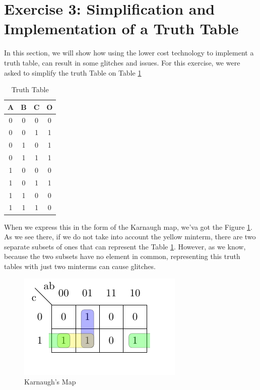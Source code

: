 \section{\color{olive}Exercise 3: Simplification and Implementation of a Truth Table }

In this section, we will show how using the lower cost technology
to implement a truth table, can result in some glitches and issues.
For this exercise, we were asked to simplify the truth Table on Table
\ref{3_1}

\begin{table}[h!]
\begin{centering}
\begin{tabular}{|c|c|c|c|}
\hline 
A & B & C & O\tabularnewline
\hline 
\hline 
0 & 0 & 0 & 0\tabularnewline
\hline 
0 & 0 & 1 & 1\tabularnewline
\hline 
0 & 1 & 0 & 1\tabularnewline
\hline 
0 & 1 & 1 & 1\tabularnewline
\hline 
1 & 0 & 0 & 0\tabularnewline
\hline 
1 & 0 & 1 & 1\tabularnewline
\hline 
1 & 1 & 0 & 0\tabularnewline
\hline 
1 & 1 & 1 & 0\tabularnewline
\hline 
\end{tabular}
\par\end{centering}
\caption{\color{cyan}Truth Table}
\label{3_1}

\end{table}

When we express this in the form of the Karnaugh map, we'va got the
Figure \ref{3_2}. As we see there, if we do not take into account
the yellow minterm, there are two separate subsets of ones that can
represent the Table \ref{3_1}. However, as we know, because the two
subsets have no element in common, representing this truth tables
with just two minterms can cause glitches.

\begin{figure}[h!]
\begin{centering}
\includegraphics[scale=0.2]{../Exercise3/images/Karnaugh}
\par\end{centering}
\caption{\color{cyan}Karnaugh's Map}
\label{3_2}

\end{figure}

